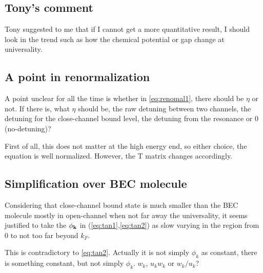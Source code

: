 \subsection{Tony's comment}
Tony suggested to me that if I cannot get a more quantitative result, I should look in the trend such as how the chemical potential or gap change at universality.  

\subsection{A point in renormalization}
A point unclear for all the time is whether  in \eqref{eq:renomal1}, there should be $\eta$ or not.  If there is, what $\eta$ should be, the raw detuning between two channels, the detuning for the close-channel bound level, the detuning from the resonance or 0 (no-detuning)?  

First of all, this does not matter at the high energy end, so either choice, the equation is well normalized.  However, the T matrix changes accordingly.  

\subsection{Simplification over BEC molecule}
Considering that close-channel bound state is much smaller than the  BEC molecule mostly in open-channel when not far away the universality, it seems justified to take the $\phi_{\mathbf{k}}$ in (\ref{eq:tan1},\ref{eq:tan2}) as slow varying in the region from 0 to not too far beyond $k_F$.    

This is contradictory to \eqref{eq:tan2}.  Actually it is not simply $\phi_k$ as constant, there is something constant, but not simply $\phi_k$. $w_k$, $u_kw_k$ or $w_k/u_k$?